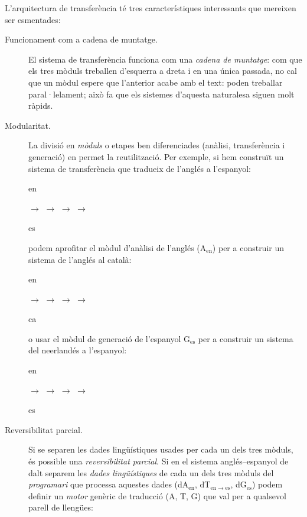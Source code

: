 L'arquitectura de transferència té tres característiques interessants
que mereixen ser esmentades:
\begin{description}
\item[Funcionament com a cadena de muntatge.] El sistema de
  transferència funciona com una \emph{cadena de muntatge}: com que
  els tres mòduls treballen d'esquerra a dreta i en una única passada,
  no cal que un mòdul espere que l'anterior acabe amb el text: poden
  treballar paral·lelament; això fa que els sistemes d'aquesta
  naturalesa siguen molt ràpids.
\item[Modularitat.] La divisió en \emph{mòduls} o etapes ben
  diferenciades (anàlisi, transferència i generació) en permet la
  reutilització. Per exemple, si hem construït un sistema de
  transferència que tradueix de l'anglés a l'espanyol:
  \begin{center}
 \parbox{0.5cm}{en} $\to$
  $\to$ 
  $\to$
  $\to$
 \parbox{0.5cm}{es} 
 \end{center}
 podem aprofitar el mòdul d'anàlisi de l'anglés (A\(_\mathrm{en}\))
 per a construir un sistema de l'anglés al català:
 \begin{center}
 \parbox{0.5cm}{en} $\to$
  $\to$ 
  $\to$
  $\to$
 \parbox{0.5cm}{ca} 
 \end{center}
 o usar el mòdul de generació de l'espanyol G\(_\mathrm{es}\) per a
 construir un sistema del neerlandés a l'espanyol:
 \begin{center}
 \parbox{0.5cm}{en} $\to$
  $\to$ 
  $\to$
  $\to$
 \parbox{0.5cm}{es} 
 \end{center}
\item[Reversibilitat parcial.]  Si se separen les dades lingüístiques
  usades per cada un dels tres mòduls, és possible una
  \emph{reversibilitat parcial}.  Si en el sistema anglés--espanyol de
  dalt separem les \emph{dades lingüístiques} de cada un dels tres
  mòduls del \emph{programari} que processa aquestes dades
  (dA\(_\mathrm{en}\), dT\(_\mathrm{en\to es}\), dG\(_\mathrm{es}\))
  podem definir un \emph{motor} genèric de traducció (A, T, G) que val
  per a qualsevol parell de llengües:
 \begin{center}

\end{center}
\end{description}
